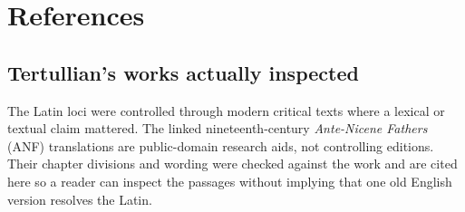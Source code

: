 \section{References}
\label{sec:tertullian-references}

\begingroup
\setlength{\parskip}{0.15em}
\titlespacing*{\subsection}{0pt}{1.35ex}{0.45ex}

\subsection{Tertullian's works actually inspected}

The Latin loci were controlled through modern critical texts where a lexical or
textual claim mattered. The linked nineteenth-century \emph{Ante-Nicene
Fathers} (ANF) translations are public-domain research aids, not controlling
editions. Their chapter divisions and wording were checked against the work and
are cited here so a reader can inspect the passages without implying that one
old English version resolves the Latin.

